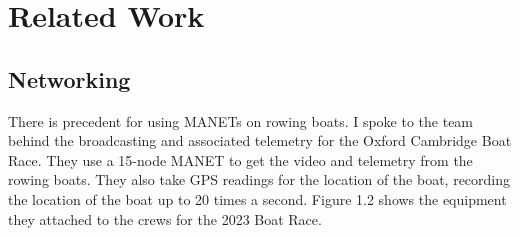 \documentclass[12pt,a4paper]{report}
\begin{document}
\section{Related Work}
\subsection{Networking}
There is precedent for using MANETs on rowing boats. I spoke to the team behind the broadcasting and associated telemetry for the Oxford Cambridge Boat Race. They use a 15-node MANET to get the video and telemetry from the rowing boats. They also take GPS readings for the location of the boat, recording the location of the boat up to 20 times a second. Figure 1.2 shows the equipment they attached to the crews for the 2023 Boat Race.  
\begin{figure}[h]
\begin{center}

\end{center}
\end{figure}
\end{document}
